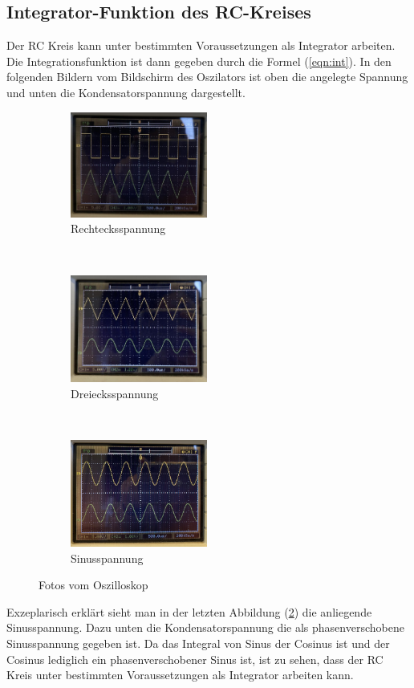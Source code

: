 \subsection{Integrator-Funktion des RC-Kreises}
    Der RC Kreis kann unter bestimmten Voraussetzungen als Integrator arbeiten. Die Integrationsfunktion ist dann gegeben durch die Formel (\ref{eqn:int}). In den folgenden Bildern vom
    Bildschirm des Oszilators ist oben die angelegte Spannung und unten die Kondensatorspannung dargestellt.

    \begin{figure}[H]
	\centering
	\begin{subfigure}[b]{0.3\textwidth}
		\centering
		\includegraphics[width=4.5cm]{Rechteck.jpg}
		\caption{Rechtecksspannung}
	\end{subfigure}
	~
	\begin{subfigure}[b]{0.3\textwidth}
		\centering
		\includegraphics[width=4.5cm]{Dreieck.jpg}
		\caption{Dreiecksspannung}
	\end{subfigure}
	~
	\begin{subfigure}[b]{0.3\textwidth}
		\centering
		\includegraphics[width=4.5cm]{Sinus.jpg}
		\caption{Sinusspannung}
        \label{fig:sinus}
	\end{subfigure}
    \caption{Fotos vom Oszilloskop}
\end{figure}

    Exzeplarisch erklärt sieht man in der letzten Abbildung (\ref{fig:sinus}) die anliegende Sinusspannung. Dazu unten die Kondensatorspannung die als phasenverschobene Sinusspannung gegeben ist.
    Da das Integral von Sinus der Cosinus ist und der Cosinus lediglich ein phasenverschobener Sinus ist, ist zu sehen, dass der RC Kreis unter bestimmten Voraussetzungen als Integrator arbeiten kann.

